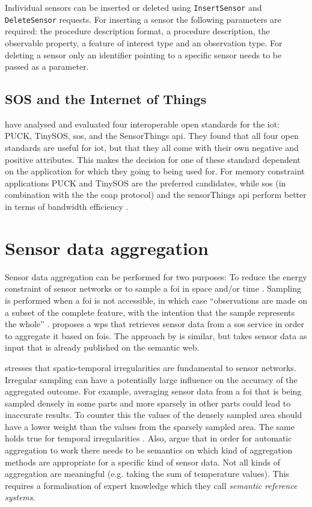 Individual sensors can be inserted or deleted using \texttt{InsertSensor} and \texttt{DeleteSensor} requests. For inserting a sensor the following parameters are required: the procedure description format, a procedure description, the observable property, a feature of interest type and an observation type. For deleting a sensor only an identifier pointing to a specific sensor needs to be passed as a parameter.

\subsection{SOS and the Internet of Things}
\cite{IOT:Jazayeri} have analysed and evaluated four interoperable open standards for the \ac{iot}: PUCK, TinySOS, \ac{sos}, and the SensorThings \ac{api}. They found that all four open standards are useful for \ac{iot}, but that they all come with their own negative and positive attributes. This makes the decision for one of these standard dependent on the application for which they going to being used for. For memory constraint applications PUCK and TinySOS are the preferred candidates, while \ac{sos} (in combination with the the coap protocol) and the sensorThings \ac{api} perform better in terms of bandwidth efficiency \citep{IOT:Jazayeri}. 

\section{Sensor data aggregation}
\label{par:agg}
Sensor data aggregation can be performed for two purposes: To reduce the energy constraint of sensor networks \citep{SW:Korteweg} or to sample a \ac{foi} in space and/or time \citep{SDI:INSPIRE2}. Sampling is performed when a \ac{foi} is not accessible, in which case \enquote{observations are made on a subset of the complete feature, with the intention that the sample represents the whole} \citep{SSW:Cox3}. \cite{SSW:Stasch3} proposes a \ac{wps} that retrieves sensor data from a \ac{sos} service in order to aggregate it based on \acp{foi}. The approach by \cite{SSW:Stasch} is similar, but takes sensor data as input that is already published on the semantic web.

\cite{SW:Ganesan} stresses that spatio-temporal irregularities are fundamental to sensor networks. Irregular sampling can have a potentially large influence on the accuracy of the aggregated outcome. For example, averaging sensor data from a \ac{foi} that is being sampled densely in some parts and more sparsely in other parts could lead to inaccurate results. To counter this the values of the densely sampled area should have a lower weight than the values from the sparsely sampled area. The same holds true for temporal irregularities \citep{SW:Ganesan}. Also, \cite{SSW:Stasch4} argue that in order for automatic aggregation to work there needs to be semantics on which kind of aggregation methods are appropriate for a specific kind of sensor data. Not all kinds of aggregation are meaningful (e.g. taking the sum of temperature values). This requires a formalisation of expert knowledge which they call \textit{semantic reference systems}.


